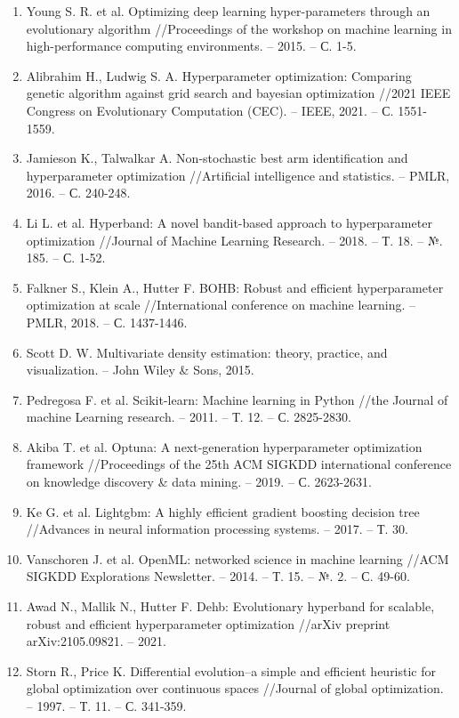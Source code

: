 \documentclass[a4paper,12pt]{article}
\begin{document}
\begin{enumerate}
\item Young S. R. et al. Optimizing deep learning hyper-parameters through an evolutionary algorithm //Proceedings of the workshop on machine learning in high-performance computing environments. – 2015. – С. 1-5.

\item Alibrahim H., Ludwig S. A. Hyperparameter optimization: Comparing genetic algorithm against grid search and bayesian optimization //2021 IEEE Congress on Evolutionary Computation (CEC). – IEEE, 2021. – С. 1551-1559.

\item Jamieson K., Talwalkar A. Non-stochastic best arm identification and hyperparameter optimization //Artificial intelligence and statistics. – PMLR, 2016. – С. 240-248.

\item Li L. et al. Hyperband: A novel bandit-based approach to hyperparameter optimization //Journal of Machine Learning Research. – 2018. – Т. 18. – №. 185. – С. 1-52.

\item Falkner S., Klein A., Hutter F. BOHB: Robust and efficient hyperparameter optimization at scale //International conference on machine learning. – PMLR, 2018. – С. 1437-1446.

\item Scott D. W. Multivariate density estimation: theory, practice, and visualization. – John Wiley \& Sons, 2015.

\item Pedregosa F. et al. Scikit-learn: Machine learning in Python //the Journal of machine Learning research. – 2011. – Т. 12. – С. 2825-2830.

\item Akiba T. et al. Optuna: A next-generation hyperparameter optimization framework //Proceedings of the 25th ACM SIGKDD international conference on knowledge discovery \& data mining. – 2019. – С. 2623-2631.

\item Ke G. et al. Lightgbm: A highly efficient gradient boosting decision tree //Advances in neural information processing systems. – 2017. – Т. 30.

\item Vanschoren J. et al. OpenML: networked science in machine learning //ACM SIGKDD Explorations Newsletter. – 2014. – Т. 15. – №. 2. – С. 49-60.

\item Awad N., Mallik N., Hutter F. Dehb: Evolutionary hyperband for scalable, robust and efficient hyperparameter optimization //arXiv preprint arXiv:2105.09821. – 2021.

\item Storn R., Price K. Differential evolution–a simple and efficient heuristic for global optimization over continuous spaces //Journal of global optimization. – 1997. – Т. 11. – С. 341-359.

\end{enumerate}
\end{document}
